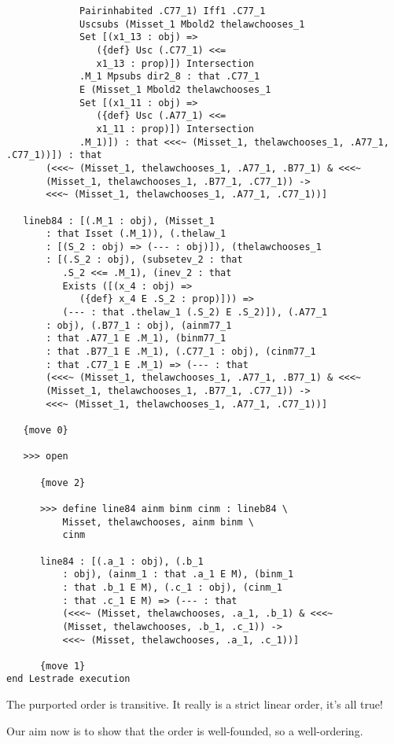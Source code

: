 \documentclass[12pt]{article}
\begin{document}
\begin{verbatim}
             Pairinhabited .C77_1) Iff1 .C77_1 
             Uscsubs (Misset_1 Mbold2 thelawchooses_1 
             Set [(x1_13 : obj) => 
                ({def} Usc (.C77_1) <<= 
                x1_13 : prop)]) Intersection 
             .M_1 Mpsubs dir2_8 : that .C77_1 
             E (Misset_1 Mbold2 thelawchooses_1 
             Set [(x1_11 : obj) => 
                ({def} Usc (.A77_1) <<= 
                x1_11 : prop)]) Intersection 
             .M_1)]) : that <<<~ (Misset_1, thelawchooses_1, .A77_1, .C77_1))]) : that 
       (<<<~ (Misset_1, thelawchooses_1, .A77_1, .B77_1) & <<<~ 
       (Misset_1, thelawchooses_1, .B77_1, .C77_1)) -> 
       <<<~ (Misset_1, thelawchooses_1, .A77_1, .C77_1))]

   lineb84 : [(.M_1 : obj), (Misset_1 
       : that Isset (.M_1)), (.thelaw_1 
       : [(S_2 : obj) => (--- : obj)]), (thelawchooses_1 
       : [(.S_2 : obj), (subsetev_2 : that 
          .S_2 <<= .M_1), (inev_2 : that 
          Exists ([(x_4 : obj) => 
             ({def} x_4 E .S_2 : prop)])) => 
          (--- : that .thelaw_1 (.S_2) E .S_2)]), (.A77_1 
       : obj), (.B77_1 : obj), (ainm77_1 
       : that .A77_1 E .M_1), (binm77_1 
       : that .B77_1 E .M_1), (.C77_1 : obj), (cinm77_1 
       : that .C77_1 E .M_1) => (--- : that 
       (<<<~ (Misset_1, thelawchooses_1, .A77_1, .B77_1) & <<<~ 
       (Misset_1, thelawchooses_1, .B77_1, .C77_1)) -> 
       <<<~ (Misset_1, thelawchooses_1, .A77_1, .C77_1))]

   {move 0}

   >>> open

      {move 2}

      >>> define line84 ainm binm cinm : lineb84 \
          Misset, thelawchooses, ainm binm \
          cinm

      line84 : [(.a_1 : obj), (.b_1 
          : obj), (ainm_1 : that .a_1 E M), (binm_1 
          : that .b_1 E M), (.c_1 : obj), (cinm_1 
          : that .c_1 E M) => (--- : that 
          (<<<~ (Misset, thelawchooses, .a_1, .b_1) & <<<~ 
          (Misset, thelawchooses, .b_1, .c_1)) -> 
          <<<~ (Misset, thelawchooses, .a_1, .c_1))]

      {move 1}
end Lestrade execution
\end{verbatim}

The purported order is transitive.  It really is a strict linear order, it's all true!

Our aim now is to show that the order is well-founded, so a well-ordering.
\end{document}
